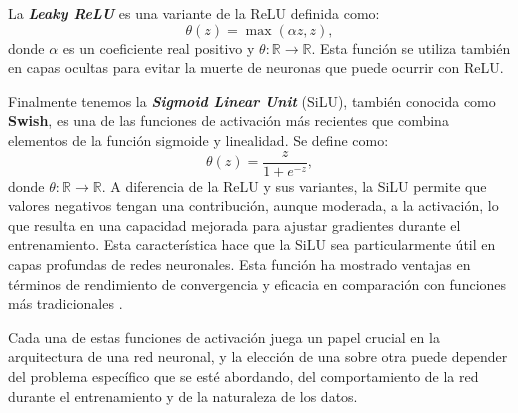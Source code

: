 La \textbf{\textit{Leaky ReLU}} es una variante de la ReLU definida como:
\begin{equation}
	\theta(z) = \max(\alpha z, z),
\end{equation}
donde \( \alpha \) es un coeficiente real positivo y \( \theta : \mathbb{R} \to \mathbb{R} \). Esta función se utiliza también en capas ocultas para evitar la muerte de neuronas que puede ocurrir con ReLU.

%
%
Finalmente tenemos la \textbf{\textit{Sigmoid Linear Unit}} (SiLU), también conocida como \textbf{Swish}, es una de las funciones de activación más recientes que combina elementos de la función sigmoide y linealidad. Se define como:
\begin{equation}
	\theta(z) = \frac{z}{1 + e^{-z}},
\end{equation}
donde \(\theta : \mathbb{R} \to \mathbb{R}\). A diferencia de la ReLU y sus variantes, la SiLU permite que valores negativos tengan una contribución, aunque moderada, a la activación, lo que resulta en una capacidad mejorada para ajustar gradientes durante el entrenamiento. Esta característica hace que la SiLU sea particularmente útil en capas profundas de redes neuronales. Esta función ha mostrado ventajas en términos de rendimiento de convergencia y eficacia en comparación con funciones más tradicionales \cite{ramachandran2017searching}.

Cada una de estas funciones de activación juega un papel crucial en la arquitectura de una red neuronal, y la elección de una sobre otra puede depender del problema específico que se esté abordando, del comportamiento de la red durante el entrenamiento y de la naturaleza de los datos.


